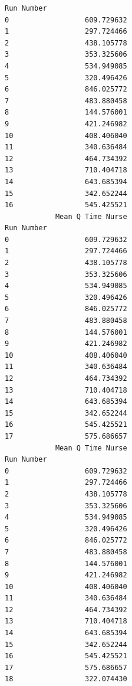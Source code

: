 \documentclass[
  letterpaper,
  DIV=11,
  numbers=noendperiod]{scrreprt}
\begin{document}
\begin{verbatim}
Run Number                   
0                  609.729632
1                  297.724466
2                  438.105778
3                  353.325606
4                  534.949085
5                  320.496426
6                  846.025772
7                  483.880458
8                  144.576001
9                  421.246982
10                 408.406040
11                 340.636484
12                 464.734392
13                 710.404718
14                 643.685394
15                 342.652244
16                 545.425521
            Mean Q Time Nurse
Run Number                   
0                  609.729632
1                  297.724466
2                  438.105778
3                  353.325606
4                  534.949085
5                  320.496426
6                  846.025772
7                  483.880458
8                  144.576001
9                  421.246982
10                 408.406040
11                 340.636484
12                 464.734392
13                 710.404718
14                 643.685394
15                 342.652244
16                 545.425521
17                 575.686657
            Mean Q Time Nurse
Run Number                   
0                  609.729632
1                  297.724466
2                  438.105778
3                  353.325606
4                  534.949085
5                  320.496426
6                  846.025772
7                  483.880458
8                  144.576001
9                  421.246982
10                 408.406040
11                 340.636484
12                 464.734392
13                 710.404718
14                 643.685394
15                 342.652244
16                 545.425521
17                 575.686657
18                 322.074430
\end{verbatim}
\end{document}
